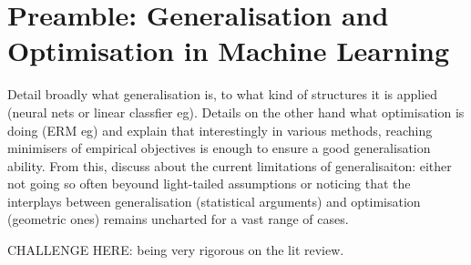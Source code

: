 \chapter*{Preamble: Generalisation and Optimisation in Machine Learning}
\mtcaddchapter
\label{chap:gen-ml}


Detail broadly what generalisation is, to what kind of structures it is applied (neural nets or linear classfier eg). Details on the other hand what optimisation is doing (ERM eg) and explain that interestingly in various methods, reaching minimisers of empirical objectives is enough to ensure a good generalisation ability. From this, discuss about the current limitations of generalisaiton: either not going so often beyound light-tailed assumptions or noticing that the interplays between generalisation (statistical arguments) and optimisation (geometric ones) remains uncharted for a vast range of cases.

CHALLENGE HERE: being very rigorous on the lit review.
